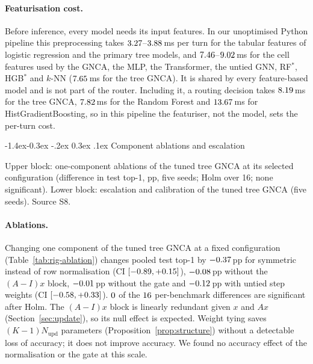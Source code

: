 \documentclass[10pt,twocolumn,letterpaper]{article}
\makeatletter
\renewcommand\subsection{\@startsection{subsection}{2}{\z@}%
  {-1.4ex\@plus -0.3ex \@minus -.2ex}%
  {0.3ex \@plus .1ex}%
  {\normalfont\normalsize\bfseries}}
\makeatother
\begin{document}
\paragraph{Featurisation cost.} Before inference, every model needs its input features. In our unoptimised Python pipeline this preprocessing takes $3.27$--$3.88$\,ms per turn for the tabular features of logistic regression and the primary tree models, and $7.46$--$9.02$\,ms for the cell features used by the GNCA, the MLP, the Transformer, the untied GNN, RF$^\ast$, HGB$^\ast$ and $k$-NN ($7.65$\,ms for the tree GNCA). It is shared by every feature-based model and is not part of the router. Including it, a routing decision takes $8.19$\,ms for the tree GNCA, $7.82$\,ms for the Random Forest and $13.67$\,ms for HistGradientBoosting, so in this pipeline the featuriser, not the model, sets the per-turn cost.

\subsection{Component ablations and escalation}\label{sec:ablation}
\begin{table}[t]
\centering
\scriptsize
\setlength{\tabcolsep}{8pt}
\caption{Upper block: one-component ablations of the tuned tree GNCA at its selected configuration (difference in test top-1, pp, five seeds; Holm over 16; none significant). Lower block: escalation and calibration of the tuned tree GNCA (five seeds). Source S8.}
\label{tab:rig-ablation}

\end{table}

\paragraph{Ablations.} Changing one component of the tuned tree GNCA at a fixed configuration (Table~\ref{tab:rig-ablation}) changes pooled test top-1 by $-0.37$\,pp for symmetric instead of row normalisation (CI $[-0.89, +0.15]$), $-0.08$\,pp without the $(A{-}I)x$ block, $-0.01$\,pp without the gate and $-0.12$\,pp with untied step weights (CI $[-0.58, +0.33]$). $0$ of the $16$ per-benchmark differences are significant after Holm. The $(A{-}I)x$ block is linearly redundant given $x$ and $Ax$ (Section~\ref{sec:update}), so its null effect is expected. Weight tying saves $(K{-}1)N_{\text{upd}}$ parameters (Proposition~\ref{prop:structure}) without a detectable loss of accuracy; it does not improve accuracy. We found no accuracy effect of the normalisation or the gate at this scale.
\end{document}
